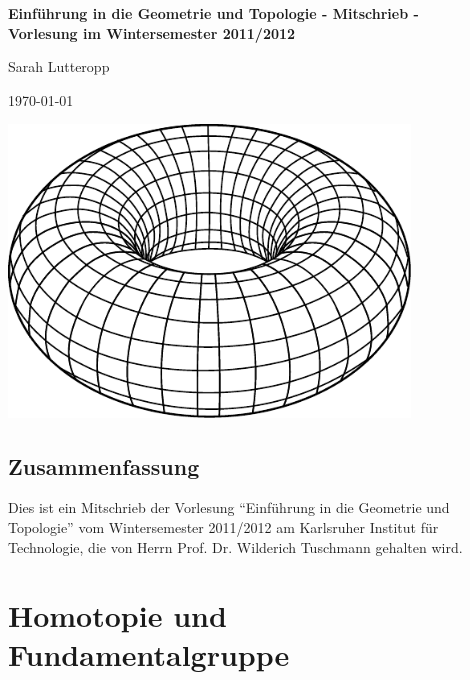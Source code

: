 \documentclass[a4paper,11pt,notitlepage]{report}
\begin{document}
\setcounter{chapter}{0} %

\begin{titlepage}
	\begin{center}	
		\LARGE \textbf{{Einführung in die Geometrie und Topologie - Mitschrieb -} \\[5ex] 
    		{\Large Vorlesung im Wintersemester 2011/2012\\[5ex]}}
	\end{center}
	\begin{center}
		\Large Sarah Lutteropp
	\end{center}
	\begin{center}
		\today
	\end{center}
	\vspace{2cm}
	\begin{center}
		\includegraphics[width=0.8\textwidth]{torus2.pdf}
	\end{center}
\end{titlepage}
\setcounter{tocdepth}{1}
\tableofcontents

\section*{Zusammenfassung}
Dies ist ein Mitschrieb der Vorlesung “Einführung in die Geometrie und Topologie” vom Wintersemester 2011/2012 am Karlsruher Institut für Technologie, die von Herrn Prof. Dr. Wilderich Tuschmann gehalten wird.

\chapter{Homotopie und Fundamentalgruppe}
\end{document}
